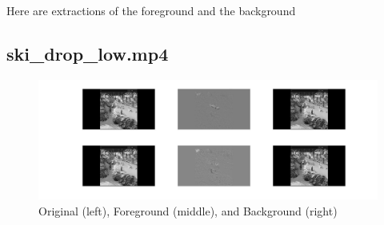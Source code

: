 \documentclass{article}
\begin{document}
Here are extractions of the foreground and the background
\subsection{ski\_drop\_low.mp4}
\begin{figure}[h]
    \centerline{\includegraphics[width=7in]{ski.jpg}}
    \caption{Original (left), Foreground (middle), and Background (right)}
\end{figure}
\end{document}
